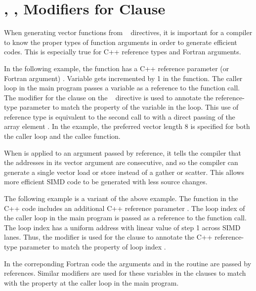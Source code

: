 \section{, ,  Modifiers for  Clause}
\label{sec:linear_modifier}

When generating vector functions from ~ directives, it is important for a compiler to know the proper types of function arguments in
order to generate efficient codes.
This is especially true for C++ reference types and Fortran arguments.

In the following example, the function  has a C++ reference
parameter (or Fortran argument) .  Variable  gets incremented by 1 in the function.
The caller loop  in the main program passes 
a variable  as a reference to the function  call.   
The  modifier for the  clause on the 
~ directive is used to annotate the 
reference-type parameter  to match the property of the variable 
 in the loop.  
This use of reference type is equivalent to the second call to 
 with a direct passing of the array element .  
In the example, the preferred vector 
length 8 is specified for both the caller loop and the callee function.

When  is applied to an argument passed by reference, 
it tells the compiler that the addresses in its vector argument are consecutive,
and so the compiler can generate a single vector load or store instead of 
a gather or scatter. This allows more efficient SIMD code to be generated with 
less source changes.

\clearpage

 
The following example is a variant of the above example. The function  in the C++ code includes an additional C++ reference parameter . 
The loop index  of the caller loop  in the main program 
is passed as a reference to the function  call.   
The loop index  has a uniform address with
linear value of step 1 across SIMD lanes. 
Thus, the  modifier is used for the  clause 
to annotate the C++ reference-type parameter  to match 
the property of loop index .

In the correponding Fortran code the arguments  and
 in the routine  are passed by references. 
Similar modifiers are used for these variables in the  clauses
to match with the property at the caller loop in the main program.

